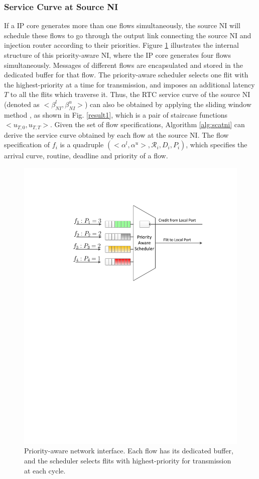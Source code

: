 \documentclass[10pt,journal]{IEEEtran}
\begin{document}
\subsubsection{Service Curve at Source NI}
If a IP core generates more than one flows simultaneously, the source NI will schedule these flows to go through the output link connecting the source NI and injection router according to their priorities. Figure \ref{ni} illustrates the internal structure of this priority-aware NI, where the IP core generates four flows simultaneously. Messages of different flows are encapsulated and stored in the dedicated buffer for that flow. The priority-aware scheduler selects one flit with the highest-priority at a time for transmission, and imposes an additional latency $T$ to all the flits which traverse it. Thus, the RTC service curve of the source NI (denoted as $<\beta^l_{NI},\beta^u_{NI}>$) can also be obtained by applying the sliding window method \cite{1253607}, as shown in Fig. \ref{result1}, which is a pair of staircase functions $<u_{T,0},u_{T,T}>$. Given the set of flow specifications, Algorithm \ref{alg:scatni} can derive the service curve obtained by each flow at the source NI. The flow specification of $f_i$ is a quadruple $(<\alpha^l,\alpha^u>,\mathcal{R}_i,D_i,P_i)$, which specifies the arrival curve, routine, deadline and priority of a flow.
\begin{figure}
  \centering
  \includegraphics[scale=0.45]{figures/NI.pdf}
  \caption{Priority-aware network interface. Each flow has its dedicated buffer, and the scheduler selects flits with highest-priority for transmission at each cycle.}\label{ni}
\end{figure}
\end{document}

